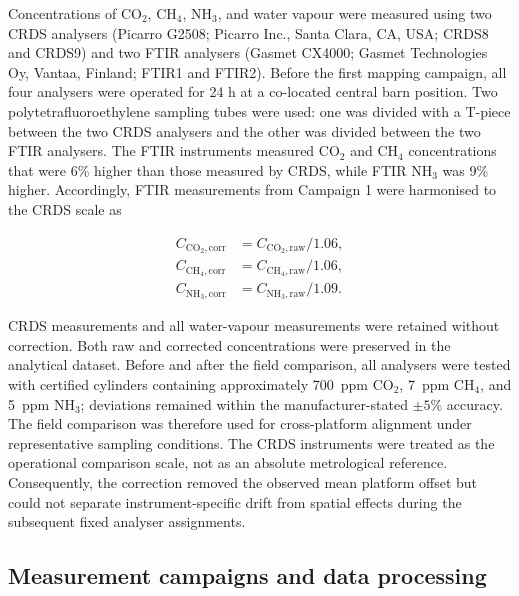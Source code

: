 \documentclass[12pt,a4paper]{article}
\begin{document}
Concentrations of \(\mathrm{CO_2}\), \(\mathrm{CH_4}\),
\(\mathrm{NH_3}\), and water vapour were measured using two CRDS analysers
(Picarro G2508; Picarro Inc., Santa Clara, CA, USA; CRDS8 and CRDS9) and two
FTIR analysers (Gasmet CX4000; Gasmet Technologies Oy, Vantaa, Finland; FTIR1
and FTIR2). Before the first
mapping campaign, all four analysers were operated for 24 h at a co-located
central barn position. Two polytetrafluoroethylene sampling tubes were used:
one was divided with a T-piece between the two CRDS analysers and the other
was divided between the two FTIR analysers. The FTIR instruments measured
\(\mathrm{CO_2}\) and \(\mathrm{CH_4}\) concentrations that were 6\% higher
than those measured by CRDS, while FTIR \(\mathrm{NH_3}\) was 9\% higher.
Accordingly, FTIR measurements from Campaign 1 were harmonised to the CRDS
scale as

\begin{align}
C_{\mathrm{CO_2,corr}} &= C_{\mathrm{CO_2,raw}}/1.06,\\
C_{\mathrm{CH_4,corr}} &= C_{\mathrm{CH_4,raw}}/1.06,\\
C_{\mathrm{NH_3,corr}} &= C_{\mathrm{NH_3,raw}}/1.09.
\end{align}

CRDS measurements and all water-vapour measurements were retained without
correction. Both raw and corrected concentrations were preserved in the
analytical dataset. Before and after the field comparison, all analysers were
tested with certified cylinders containing approximately \SI{700}{ppm}
\(\mathrm{CO_2}\), \SI{7}{ppm} \(\mathrm{CH_4}\), and \SI{5}{ppm}
\(\mathrm{NH_3}\); deviations remained within the manufacturer-stated
\(\pm 5\%\) accuracy. The field comparison was therefore used for
cross-platform alignment under representative sampling conditions. The CRDS
instruments were treated as the operational comparison scale, not as an
absolute metrological reference. Consequently, the correction removed the
observed mean platform offset but could not separate instrument-specific
drift from spatial effects during the subsequent fixed analyser assignments.

\subsection{Measurement campaigns and data processing}
\end{document}
